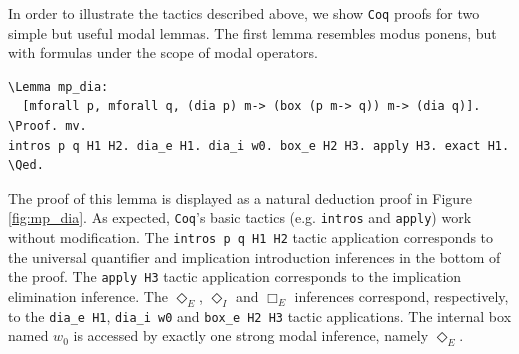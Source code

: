 \documentclass{llncs}
\newcommand{\imp}{\rightarrow}
\newcommand{\all}{\forall}
\newcommand{\nec}{\Box} %
\newcommand{\pos}{\Diamond} %
\newcommand{\red}[1]{\textcolor[rgb]{1,0,0}{#1}}
\newcommand{\blue}[1]{\textcolor[rgb]{0,0,1}{#1}}
\newcommand{\Lemma}{\red{Lemma}}
\newcommand{\Proof}{\blue{Proof}}
\newcommand{\Qed}{\blue{Qed}}
\newcommand{\Coq}{\texttt{Coq}\xspace}
\begin{document}
In order to illustrate the tactics described above, 
we show \Coq proofs for two simple but useful modal lemmas. 
The first lemma resembles modus ponens, but with formulas 
under the scope of modal operators. 

\begin{Verbatim}[commandchars=\\\{\},fontsize=\verbsize]
\Lemma mp_dia: 
  [mforall p, mforall q, (dia p) m-> (box (p m-> q)) m-> (dia q)].
\Proof. mv. 
intros p q H1 H2. dia_e H1. dia_i w0. box_e H2 H3. apply H3. exact H1. 
\Qed.
\end{Verbatim}




\noindent 
The proof of this lemma is displayed as a natural deduction
proof in  Figure \ref{fig:mp_dia}. As expected, \Coq's basic tactics
(e.g. \texttt{intros} and \texttt{apply}) work without modification.
The \texttt{intros p q H1 H2} tactic application corresponds to the
universal quantifier  and implication introduction inferences in the
bottom of the proof.  The \texttt{apply H3} tactic application
corresponds to the implication  elimination inference. The $\pos_E$,
$\pos_I$ and $\nec_E$ inferences correspond, respectively, to the
\texttt{dia\_e H1},  \texttt{dia\_i w0} and \texttt{box\_e H2 H3}
tactic applications.  The internal box named $w_0$ is accessed by
exactly one strong  modal inference, namely $\pos_E$.
\end{document}
